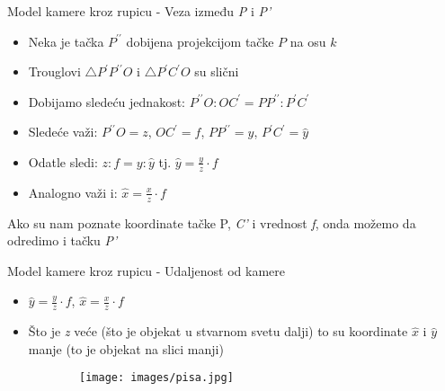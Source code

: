 \documentclass[bookmarks=true,bookmarksopen=true,pdfborder={0 0 0},pdfhighlight={/N},linkbordercolor={.5 .5 .5},implicit=false,unicode,xcolor={table}]{beamer}
\begin{document}
\begin{frame}{Model kamere kroz rupicu - Veza između \textit{P} i \textit{P'}}

  \begin{itemize}
    \item Neka je tačka $P^{\prime \prime}$ dobijena projekcijom tačke $P$ na osu $k$
    \item Trouglovi $\triangle P^{\prime}P^{\prime \prime} O$ i $\triangle P^{\prime} C^{\prime} O$ su slični
    \item Dobijamo sledeću jednakost: $P^{\prime \prime}O : OC^{\prime} = PP^{\prime \prime} : P^{\prime} C^{\prime}$
    \item Sledeće važi: $P^{\prime \prime}O = z$, $OC^{\prime} = f$, $PP^{\prime \prime} = y$, $P^{\prime} C^{\prime} = \hat{y}$
    \item Odatle sledi: $z : f = y : \hat{y}$ tj. $\hat{y} = \frac{y}{z} \cdot f$
    \item Analogno važi i: $\hat{x} = \frac{x}{z} \cdot f$
  \end{itemize}
  Ako su nam poznate koordinate tačke P, \textit{C'} i vrednost \textit{f}, onda možemo da odredimo i tačku \textit{P'}

\end{frame}

\begin{frame}{Model kamere kroz rupicu - Udaljenost od kamere}

  \begin{itemize}
    \item $\hat{y} = \frac{y}{z} \cdot f$, $\hat{x} = \frac{x}{z} \cdot f$
    \item Što je \textit{z} veće (što je objekat u stvarnom svetu dalji) to su koordinate $\hat{x}$ i $\hat{y}$ manje (to je objekat na slici manji)
  \end{itemize}
  \begin{figure}
    \begin{subfigure}{7cm}
      \texttt{[image: images/pisa.jpg]}
    \end{subfigure}
  \end{figure}

\end{frame}
\end{document}
